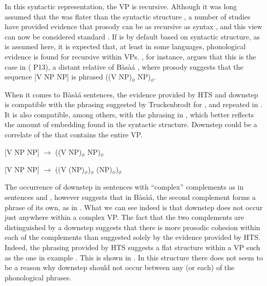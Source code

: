 \documentclass[output=paper,newtxmath,modfonts,nonflat]{langsci/langscibook}
\begin{document}
\noindent In this syntactic representation, the VP is recursive. Although it was long assumed that the  was flater than the syntactic structure \citep{Selkirk81,Selkirk84,Selkirk86, NesporVogel86}, a number of studies have provided evidence that prosody can be as recursive as syntax \citep{Ladd86}, and this view can now be considered standard \citep[a.o.][]{Selkirk95b, Selkirk09, Selkirk11, Truckenbrodt99, Wagner05, Elfner12}. If  is by default based on syntactic structure, as is assumed here, it is expected that, at least in some languages, phonological evidence is found for recursive  within VPs. \citet{Truckenbrodt99}, for instance, argues that this is the case in  ( P13), a distant relative of Bàsà{á} \citep{Odden87,Odden90}, where prosody suggests that the sequence [V NP NP] is phrased ((V NP)$_{\phi}$ NP)$_{\phi}$. 

When it comes to Bàsà{á} sentences, the evidence provided by HTS and downstep is compatible with the phrasing suggested by Truckenbrodt for , and repeated in . It is also compatible, among others, with the phrasing in  \citep{Selkirk09, Selkirk11}, which better reflects the amount of embedding found in the syntactic structure. Downstep could be a correlate of the  that contains the entire VP.


\ea{} [V NP NP] $\to$ ((V NP)$_{\phi}$ NP)$_{\phi}$\label{ex:HamlaouiMakasso:23}
\z

\ea{} [V NP NP] $\to$ ((V (NP)$_{\phi}$)$_{\phi}$ (NP)$_{\phi}$)$_{\phi}$\label{ex:HamlaouiMakasso:24}
\z

The occurrence of downstep in sentences with ``complex'' complements as in sentences  and , however suggests that in Bàsà{á}, the second complement forms a phrase of its own, as in . What we can see indeed is that downstep does not occur just anywhere within a complex VP. The fact that the two complements are distinguished by a downstep suggests that there is more prosodic cohesion within each of the complements than suggested solely by the evidence provided by HTS. Indeed, the phrasing provided by HTS suggests a flat structure within a VP such as the one in example . This is shown in . In this structure there does not seem to be a reason why downstep should not occur between any (or each) of the phonological phrases.
\end{document}
